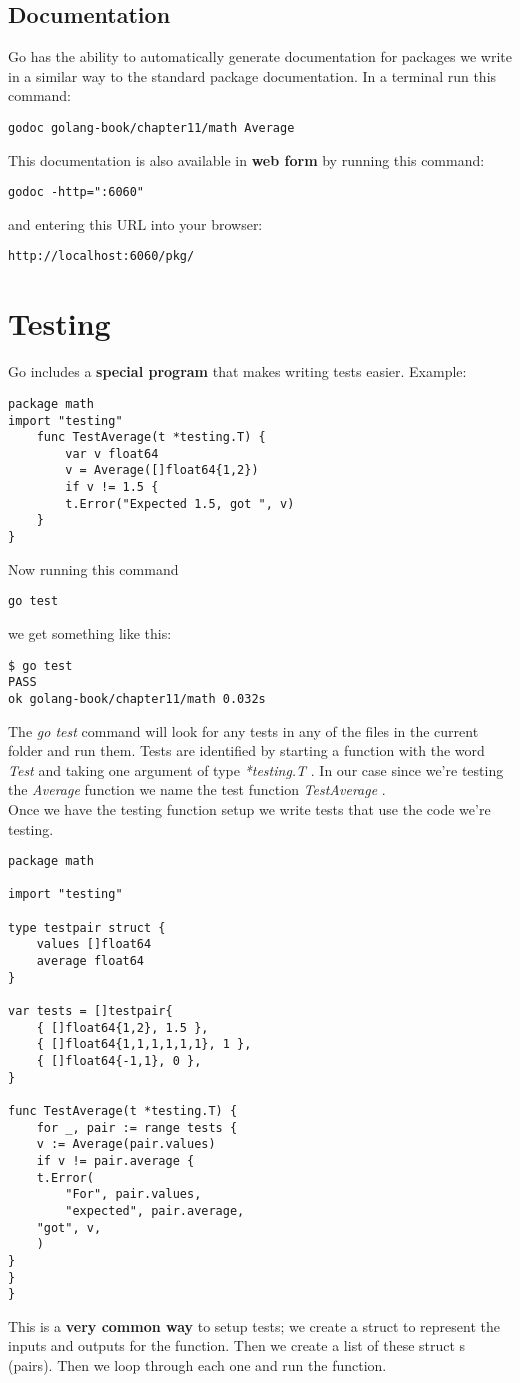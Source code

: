 \documentclass[10pt,letterpaper]{report}
\begin{document}
\section{Documentation}
Go has the ability to automatically generate documentation for packages we write in a similar way to the standard package documentation. In a terminal run this command:
\begin{lstlisting}
godoc golang-book/chapter11/math Average
\end{lstlisting}
This documentation is also available in \textbf{web form} by running this command:
\begin{lstlisting}
godoc -http=":6060"
\end{lstlisting}
and entering this URL into your browser:
\begin{lstlisting}
http://localhost:6060/pkg/
\end{lstlisting}
\chapter{Testing}
Go includes a \textbf{special program }that makes writing tests easier. Example:
\begin{lstlisting}
package math
import "testing"
	func TestAverage(t *testing.T) {
		var v float64
		v = Average([]float64{1,2})
		if v != 1.5 {
		t.Error("Expected 1.5, got ", v)
	}
}
\end{lstlisting}
Now running this command
\begin{lstlisting}
go test
\end{lstlisting}
we get something like this:
\begin{lstlisting}
$ go test
PASS
ok golang-book/chapter11/math 0.032s
\end{lstlisting}
The \textit{go test} command will look for any tests in any of the files in the current folder and run them. Tests are identified by starting a function with the word \textit{Test} and taking one argument of type \textit{*testing.T} . In our case since we're testing the \textit{Average} function we name the test function \textit{TestAverage} .\\
Once we have the testing function setup we write tests that use the code we're testing.
\begin{lstlisting}
package math

import "testing"

type testpair struct {
	values []float64
	average float64
}

var tests = []testpair{
	{ []float64{1,2}, 1.5 },
	{ []float64{1,1,1,1,1,1}, 1 },
	{ []float64{-1,1}, 0 },
}

func TestAverage(t *testing.T) {
	for _, pair := range tests {
	v := Average(pair.values)
	if v != pair.average {
	t.Error(
		"For", pair.values,
		"expected", pair.average,
	"got", v,
	)
}
}
}
\end{lstlisting}
This is a \textbf{very common way} to setup tests; we create a struct to represent the inputs and outputs for the function. Then we create a list of these struct s (pairs). Then we loop through each one and run the function.
\end{document}
